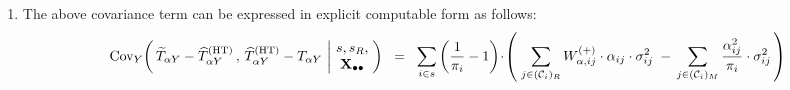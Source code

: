 \begin{lemma}
\begin{enumerate}
\begin{eqnarray*}
            \,\left\vert\!
            \begin{array}{c} s,s_{R}, \\ \Xobs \end{array}
            \right.
            \!\!\right)
        \; + \;
        E_{Y}\!\left[\;
            \widetilde{T}_{\alpha Y} - \widehat{T}^{\textnormal{(HT)}}_{\alpha Y}
            \,\left\vert\!
            \begin{array}{c} s,s_{R}, \\ \Xobs \end{array}
            \right.
            \!\!\right]
        \cdot
        {\color{red}E_{Y}\!\left[\;
            \widehat{T}^{\textnormal{(HT)}}_{\alpha Y} - T_{\alpha Y}
            \,\left\vert\!
            \begin{array}{c} s,s_{R}, \\ \Xobs \end{array}
            \right.
            \!\!\right]}
    \end{eqnarray*}
\item
    The above covariance term can be expressed in explicit computable form as follows:
    \begin{eqnarray*}
    &&
        \textnormal{Cov}_{Y}\!\left(\,
            \widetilde{T}_{\alpha Y} - \widehat{T}^{\textnormal{(HT)}}_{\alpha Y}
            \,,\,
            \widehat{T}^{\textnormal{(HT)}}_{\alpha Y} - T_{\alpha Y}
            \,\left\vert\!
            \begin{array}{c} s,s_{R}, \\ \mathbf{X}_{\bullet\bullet} \end{array}
            \right.
            \!\!\right)
    \;\; = \;\;
        \underset{i \in {\color{black}s}}{\sum}
        \left(\dfrac{1}{\pi_{i}}-1\right)
        \!\cdot\!
        \left(\;
            \underset{j \in (\mathcal{C}_{i})_{R}}{\sum}\,
            W^{(+)}_{\alpha,ij}\cdot\alpha_{ij}\cdot\sigma_{ij}^{2}
            \; - \,
            \underset{j \in (\mathcal{C}_{i})_{M}}{\sum}\,
            \dfrac{ \alpha_{ij}^{2} }{ \pi_{i} }
            \cdot\sigma_{ij}^{2}
            \,\right)
    \end{eqnarray*}
\end{enumerate}
\end{lemma}
